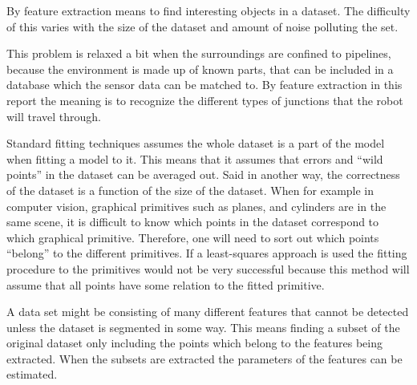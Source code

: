 By feature extraction means to find interesting objects in a dataset. The difficulty of
this varies with the size of the dataset and amount of noise polluting the set.

This problem is relaxed a bit when the surroundings are confined to pipelines, because the
environment is made up of known parts, that can be included in a database which the
sensor data can be matched to. 
By feature extraction in this report the meaning is to recognize the different types of junctions
that the robot will travel through. 

Standard fitting techniques assumes the whole dataset is a part of the model when fitting
a model to it. This
means that it assumes that errors and ``wild points'' in the dataset can be averaged out.
Said in another way, the correctness of the dataset is a function of the size of the
dataset. When for example in computer vision, graphical primitives such as planes, and
cylinders are in the same scene, it is difficult to know which points in the dataset
correspond to which graphical primitive. Therefore, one will need to sort out which points
``belong'' to the different primitives. If a least-squares approach is used the fitting
procedure to the primitives would not be very successful because this method will assume
that all points have some relation to the fitted primitive. \cite{ransac}

A data set might be consisting of many different features that cannot be detected unless
the dataset is segmented in some way. This means finding a subset of the original dataset
only including the points which belong to the features being extracted. 
When the subsets are extracted the parameters of the features can be estimated. 


